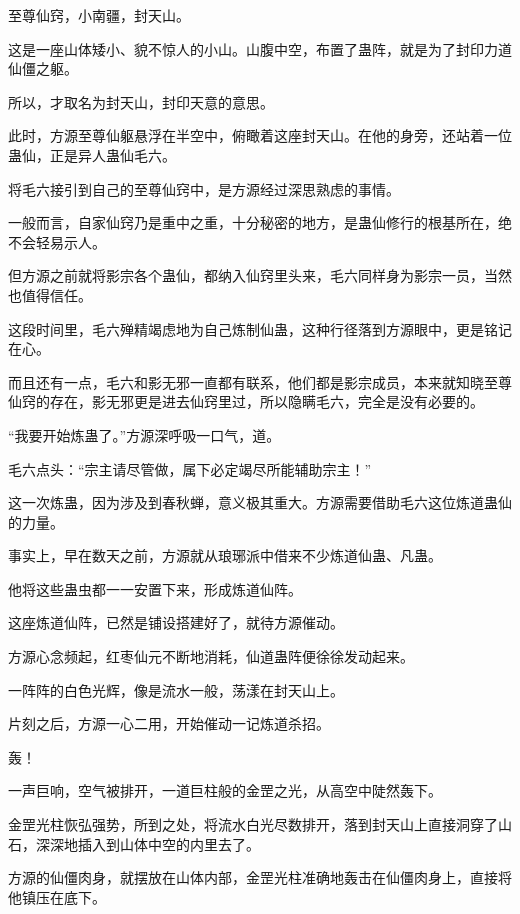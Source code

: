 
\begin{this_body}



至尊仙窍，小南疆，封天山。

这是一座山体矮小、貌不惊人的小山。山腹中空，布置了蛊阵，就是为了封印力道仙僵之躯。

所以，才取名为封天山，封印天意的意思。

此时，方源至尊仙躯悬浮在半空中，俯瞰着这座封天山。在他的身旁，还站着一位蛊仙，正是异人蛊仙毛六。

将毛六接引到自己的至尊仙窍中，是方源经过深思熟虑的事情。

一般而言，自家仙窍乃是重中之重，十分秘密的地方，是蛊仙修行的根基所在，绝不会轻易示人。

但方源之前就将影宗各个蛊仙，都纳入仙窍里头来，毛六同样身为影宗一员，当然也值得信任。

这段时间里，毛六殚精竭虑地为自己炼制仙蛊，这种行径落到方源眼中，更是铭记在心。

而且还有一点，毛六和影无邪一直都有联系，他们都是影宗成员，本来就知晓至尊仙窍的存在，影无邪更是进去仙窍里过，所以隐瞒毛六，完全是没有必要的。

“我要开始炼蛊了。”方源深呼吸一口气，道。

毛六点头：“宗主请尽管做，属下必定竭尽所能辅助宗主！”

这一次炼蛊，因为涉及到春秋蝉，意义极其重大。方源需要借助毛六这位炼道蛊仙的力量。

事实上，早在数天之前，方源就从琅琊派中借来不少炼道仙蛊、凡蛊。

他将这些蛊虫都一一安置下来，形成炼道仙阵。

这座炼道仙阵，已然是铺设搭建好了，就待方源催动。

方源心念频起，红枣仙元不断地消耗，仙道蛊阵便徐徐发动起来。

一阵阵的白色光辉，像是流水一般，荡漾在封天山上。

片刻之后，方源一心二用，开始催动一记炼道杀招。

轰！

一声巨响，空气被排开，一道巨柱般的金罡之光，从高空中陡然轰下。

金罡光柱恢弘强势，所到之处，将流水白光尽数排开，落到封天山上直接洞穿了山石，深深地插入到山体中空的内里去了。

方源的仙僵肉身，就摆放在山体内部，金罡光柱准确地轰击在仙僵肉身上，直接将他镇压在底下。


\end{this_body}
